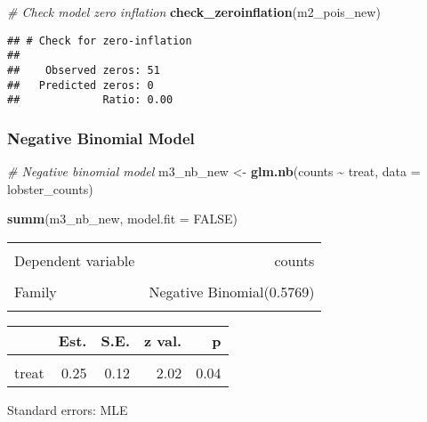 \documentclass[
]{article}
\newenvironment{Shaded}{\begin{snugshade}}{\end{snugshade}}
\newcommand{\AttributeTok}[1]{\textcolor[rgb]{0.13,0.29,0.53}{#1}}
\newcommand{\CommentTok}[1]{\textcolor[rgb]{0.56,0.35,0.01}{\textit{#1}}}
\newcommand{\ConstantTok}[1]{\textcolor[rgb]{0.56,0.35,0.01}{#1}}
\newcommand{\FunctionTok}[1]{\textcolor[rgb]{0.13,0.29,0.53}{\textbf{#1}}}
\newcommand{\NormalTok}[1]{#1}
\newcommand{\OtherTok}[1]{\textcolor[rgb]{0.56,0.35,0.01}{#1}}
\newcommand{\SpecialCharTok}[1]{\textcolor[rgb]{0.81,0.36,0.00}{\textbf{#1}}}
\begin{document}
\begin{Shaded}
\begin{Highlighting}[]
\CommentTok{\# Check model zero inflation}
\FunctionTok{check\_zeroinflation}\NormalTok{(m2\_pois\_new)}
\end{Highlighting}
\end{Shaded}

\begin{verbatim}
## # Check for zero-inflation
## 
##    Observed zeros: 51
##   Predicted zeros: 0
##             Ratio: 0.00
\end{verbatim}

\hypertarget{negative-binomial-model}{%
\subsubsection{Negative Binomial Model}\label{negative-binomial-model}}

\begin{Shaded}
\begin{Highlighting}[]
\CommentTok{\# Negative binomial model}
\NormalTok{m3\_nb\_new }\OtherTok{\textless{}{-}} \FunctionTok{glm.nb}\NormalTok{(counts }\SpecialCharTok{\textasciitilde{}}\NormalTok{ treat, }\AttributeTok{data =}\NormalTok{ lobster\_counts)}

\FunctionTok{summ}\NormalTok{(m3\_nb\_new, }\AttributeTok{model.fit =} \ConstantTok{FALSE}\NormalTok{)}
\end{Highlighting}
\end{Shaded}

\begin{table}[!h]
\centering
\begin{tabular}{lr}
\toprule
\cellcolor{gray!10}{Observations} & \cellcolor{gray!10}{466}\\
Dependent variable & counts\\
\cellcolor{gray!10}{Type} & \cellcolor{gray!10}{Generalized linear model}\\
Family & Negative Binomial(0.5769)\\
\cellcolor{gray!10}{Link} & \cellcolor{gray!10}{log}\\
\bottomrule
\end{tabular}
\end{table}  \begin{table}[!h]
\centering
\begin{threeparttable}
\begin{tabular}{lrrrr}
\toprule
  & Est. & S.E. & z val. & p\\
\midrule
\cellcolor{gray!10}{(Intercept)} & \cellcolor{gray!10}{3.31} & \cellcolor{gray!10}{0.08} & \cellcolor{gray!10}{38.97} & \cellcolor{gray!10}{0.00}\\
treat & 0.25 & 0.12 & 2.02 & 0.04\\
\bottomrule
\end{tabular}
\begin{tablenotes}
\item Standard errors: MLE
\end{tablenotes}
\end{threeparttable}
\end{table}
\end{document}

